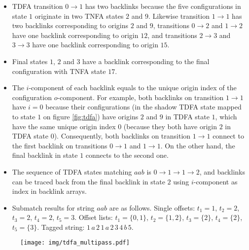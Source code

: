 \documentclass[]{article}
\begin{document}
\begin{itemize}

\item[\ding{212}]
TDFA transition $0 \!\rightarrow\! 1$ has two backlinks
because the five configurations in state $1$ originate in two TNFA states $2$ and $9$.
Likewise transition $1 \!\rightarrow\! 1$ has two backlinks corresponding to origins $2$ and $9$,
transitions $0 \!\rightarrow\! 2$ and $1 \!\rightarrow\! 2$ have one backlink corresponding to origin $12$,
and transitions $2 \!\rightarrow\! 3$ and $3 \!\rightarrow\! 3$ have one backlink corresponding to origin $15$.
\medskip

\item[\ding{212}]
Final states $1$, $2$ and $3$ have a backlink corresponding to the final configuration with TNFA state $17$.
\medskip

\item[\ding{212}]
The $i$-component of each backlink equals to the unique origin index of the configuration $o$-component.
For example, both backlinks on transition $1 \!\rightarrow\! 1$ have $i=0$ because
their configurations (in the shadow TDFA state mapped to state $1$ on figure \ref{fig:tdfa}) have origins $2$ and $9$ in TDFA state $1$,
which have the same unique origin index $0$ (because they both have origin $2$ in TDFA state $0$).
Consequently, both backlinks on transition $1 \!\rightarrow\! 1$ connect to the first backlink on transitions $0 \!\rightarrow\! 1$ and $1 \!\rightarrow\! 1$.
On the other hand, the final backlink in state $1$ connects to the second one.
\medskip

\item[\ding{212}]
The sequence of TDFA states matching $aab$ is $0 \!\rightarrow\! 1 \!\rightarrow\! 1 \!\rightarrow\! 2$,
and backlinks can be traced back from the final backlink in state $2$
using $i$-component as index in backlink arrays.
\medskip

\item[\ding{212}]
Submatch results for string $aab$ are as follows.
Single offsets: $t_1\!=\!1$, $t_2\!=\!2$, $t_3\!=\!2$, $t_4\!=\!2$, $t_5\!=\!3$.
Offset lists: $t_1\!=\!\{0,1\}$, $t_2\!=\!\{1,2\}$, $t_3\!=\!\{2\}$, $t_4\!=\!\{2\}$, $t_5\!=\!\{3\}$.
Tagged string: $1\,a\,2\,1\,a\,2\,3\,4\,b\,5$.
\medskip

\end{itemize}

\begin{figure}[h]
\texttt{[image: img/tdfa\_multipass.pdf]}
\vspace{0.5em}
\label{fig:tdfa_multipass}
\end{figure}
\end{document}
